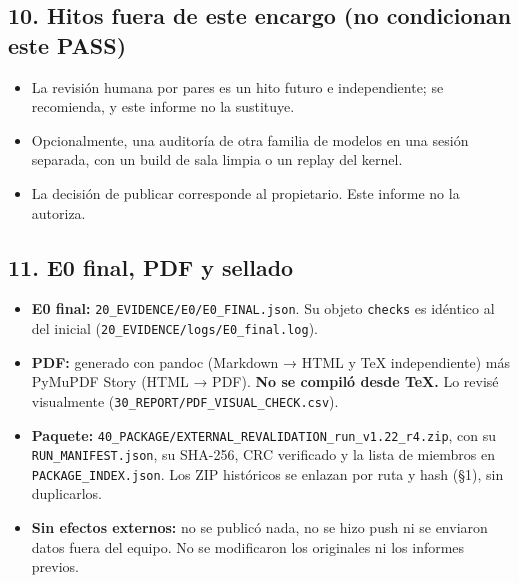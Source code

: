 \documentclass[
]{article}
\providecommand{\tightlist}{%
  \setlength{\itemsep}{0pt}\setlength{\parskip}{0pt}}
\begin{document}
\subsection{10. Hitos fuera de este encargo (no condicionan este
PASS)}\label{10-hitos-fuera-de-este-encargo-no-condicionan-este-pass}

\begin{itemize}
\tightlist
\item
  La revisión humana por pares es un hito futuro e independiente; se
  recomienda, y este informe no la sustituye.
\item
  Opcionalmente, una auditoría de otra familia de modelos en una sesión
  separada, con un build de sala limpia o un replay del kernel.
\item
  La decisión de publicar corresponde al propietario. Este informe no la
  autoriza.
\end{itemize}

\subsection{11. E0 final, PDF y
sellado}\label{11-e0-final-pdf-y-sellado}

\begin{itemize}
\tightlist
\item
  \textbf{E0 final:} \texttt{20\_EVIDENCE/E0/E0\_FINAL.json}. Su objeto
  \texttt{checks} es idéntico al del inicial
  (\texttt{20\_EVIDENCE/logs/E0\_final.log}).
\item
  \textbf{PDF:} generado con pandoc (Markdown → HTML y TeX
  independiente) más PyMuPDF Story (HTML → PDF). \textbf{No se compiló
  desde TeX.} Lo revisé visualmente
  (\texttt{30\_REPORT/PDF\_VISUAL\_CHECK.csv}).
\item
  \textbf{Paquete:}
  \texttt{40\_PACKAGE/EXTERNAL\_REVALIDATION\_run\_v1.22\_r4.zip}, con
  su \texttt{RUN\_MANIFEST.json}, su SHA-256, CRC verificado y la lista
  de miembros en \texttt{PACKAGE\_INDEX.json}. Los ZIP históricos se
  enlazan por ruta y hash (§1), sin duplicarlos.
\item
  \textbf{Sin efectos externos:} no se publicó nada, no se hizo push ni
  se enviaron datos fuera del equipo. No se modificaron los originales
  ni los informes previos.
\end{itemize}
\end{document}
